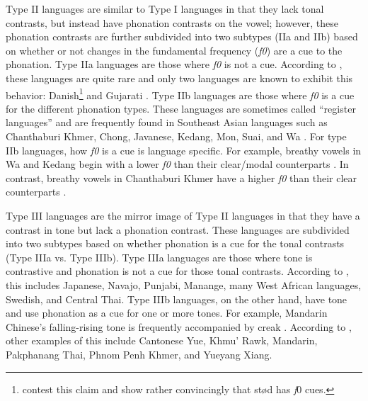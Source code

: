 Type II languages are similar to Type I languages in that they lack tonal contrasts, but instead have phonation contrasts on the vowel; however, these phonation contrasts are further subdivided into two subtypes (IIa and IIb) based on whether or not changes in the fundamental frequency (\textit{f0}) are a cue to the phonation. Type IIa languages are those where \textit{f0} is not a cue. According to \citet{espositoCrosslinguisticPatternsPhonation2020}, these languages are quite rare and only two languages are known to exhibit this behavior: Danish\footnote{\citet{frazierPhoneticsYucatecMaya2013,penaStodTimingDomain2022,penaProductionPerceptionStod2024} contest this claim and show rather convincingly that stød has \textit{f}0 cues.} \citep{gronnumDanishStodLaryngealization2013} and Gujarati \citep{khanPhoneticsContrastivePhonation2012}. Type IIb languages are those where \textit{f0} is a cue for the different phonation types. These languages are sometimes called ``register languages'' and are frequently found in Southeast Asian languages such as Chanthaburi Khmer, Chong, Javanese, Kedang, Mon, Suai, and Wa \citep[e.g.,][]{brunelleTonePhonationSoutheast2016,dicanioPhoneticsRegisterTakhian2009,samelyKedangEasternIndonesia1991,waylandAcousticCorrelatesBreathy2003}. For type IIb languages, how \textit{f0} is a cue is language specific. For example, breathy vowels in Wa and Kedang begin with a lower \textit{f0} than their clear/modal counterparts \citep{samelyKedangEasternIndonesia1991}. In contrast, breathy vowels in Chanthaburi Khmer have a higher \textit{f0} than their clear counterparts \citep{waylandAcousticCorrelatesBreathy2003}. 

Type III languages are the mirror image of Type II languages in that they have a contrast in tone but lack a phonation contrast. These languages are subdivided into two subtypes based on whether phonation is a cue for the tonal contrasts (Type IIIa vs. Type IIIb). Type IIIa languages are those where tone is contrastive and phonation is not a cue for those tonal contrasts. According to \citep{espositoCrosslinguisticPatternsPhonation2020}, this includes Japanese, Navajo, Punjabi, Manange, many West African languages, Swedish, and Central Thai. Type IIIb languages, on the other hand, have tone and use phonation as a cue for one or more tones. For example, Mandarin Chinese's falling-rising tone is frequently accompanied by creak \citep[e.g.,][]{kuangCovariationVoiceQuality2017}. According to \citep{espositoCrosslinguisticPatternsPhonation2020}, other examples of this include Cantonese Yue, Khmu' Rawk, Mandarin, Pakphanang Thai, Phnom Penh Khmer, and Yueyang Xiang.

